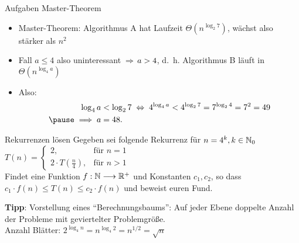 \begin{frame}{Aufgaben Master-Theorem}
	\solutionheading 
	\begin{itemize}
		\item Master-Theorem: Algorithmus A hat Laufzeit $\Theta(n^{\log _{2}7})$, wächst also stärker als $n^2$
		\pause
		\item Fall $a \leq 4$ also uninteressant $\impl a > 4$, d.~h. Algorithmus B läuft in $\Theta(n^{\log _{4}a})$ \\
		\pause 
		\item Also: 
		\begin{align*}
			\log_{4}a &< \log_{2}7 \gdw 4^{\log_{4}a} < 4^{\log_{2}7} = 7^{\log_{2} 4} = 7^2 = 49 \\ \pause  %
			\Impl a &= 48.
		\end{align*}
	\end{itemize}
\end{frame}


\begin{frame}{Rekurrenzen lösen}
	Gegeben sei folgende Rekurrenz für $n = 4^k, k \in \mathbb{N}_0$ \\[0,5cm]
	\begin{math}
	T(n) = 
	\begin{cases}
	2,                       & \text{für } n = 1 \\
	2 \cdot T(\frac{n}{4}),  & \text{für } n > 1
	\end{cases}
	\end{math} \\[0,5cm]
	Findet eine Funktion $f : \mathbb{N} \longrightarrow \mathbb{R}^+$ und Konstanten $c_1, c_2$, so dass $c_1 \cdot f(n) \leq T(n) \leq c_2 \cdot f(n)$ und beweist euren Fund.
	
	\pause
	\bigskip
	\textbf{Tipp}: Vorstellung eines \enquote{Berechnungsbaums}: Auf jeder Ebene doppelte Anzahl der Probleme mit geviertelter Problemgröße.\\ \pause
	\impl Anzahl Blätter: \quad $2^{\log_{4}n} = n^{\log_{4}2} = n^{1/2} = \sqrt{n}$
\end{frame}

